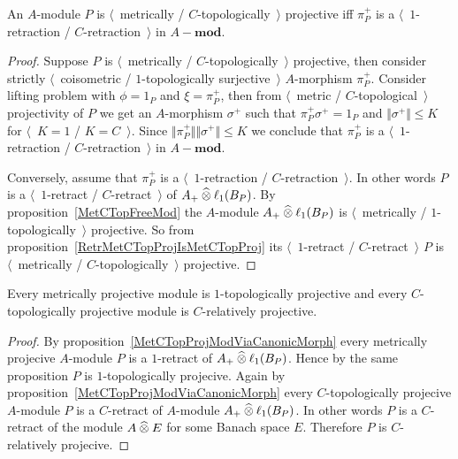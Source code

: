 \begin{proposition}\label{MetCTopProjModViaCanonicMorph} An $A$-module $P$ is
$\langle$~metrically / $C$-topologically~$\rangle$ projective iff $\pi_P^+$ is 
a $\langle$~$1$-retraction / $C$-retraction~$\rangle$ in $A-\mathbf{mod}$.
\end{proposition}
\begin{proof}
Suppose $P$ is 
$\langle$~metrically / $C$-topologically~$\rangle$ projective, then consider 
strictly $\langle$~coisometric / $1$-topologically surjective~$\rangle$
$A$-morphism $\pi_P^+$. Consider lifting problem with $\phi=1_P$ 
and $\xi=\pi_P^+$, then from $\langle$~metric / $C$-topological~$\rangle$ 
projectivity of $P$ we get an $A$-morphism $\sigma^+$ such 
that $\pi_P^+\sigma^+=1_P$
and $\Vert\sigma^+\Vert\leq K$ for $\langle$~$K=1$ / $K=C$~$\rangle$.
Since $\Vert\pi_P^+\Vert\Vert \sigma^+\Vert\leq K$ 
we conclude that $\pi_P^+$ is a
$\langle$~$1$-retraction / $C$-retraction~$\rangle$ in $A-\mathbf{mod}$.

Conversely, assume that $\pi_P^+$ is 
a $\langle$~$1$-retraction / $C$-retraction~$\rangle$. In other words $P$ is 
a $\langle$~$1$-retract / $C$-retract~$\rangle$ of $A_+\mathbin{\widehat{\otimes}} \ell_1(B_P)$. 
By proposition~\ref{MetCTopFreeMod} the $A$-module $A_+\mathbin{\widehat{\otimes}} \ell_1(B_P)$ 
is $\langle$~metrically / $1$-topologically~$\rangle$ projective. So from 
proposition~\ref{RetrMetCTopProjIsMetCTopProj} 
its $\langle$~$1$-retract / $C$-retract~$\rangle$ $P$ is 
$\langle$~metrically / $C$-topologically~$\rangle$ projective.
\end{proof}

\begin{proposition}\label{MetProjIsTopProjAndTopProjIsRelProj} Every metrically
projective module is $1$-topologically projective and every $C$-topologically 
projective module is $C$-relatively projective.
\end{proposition}
\begin{proof} By proposition~\ref{MetCTopProjModViaCanonicMorph} every 
metrically projecive $A$-module $P$ is a $1$-retract 
of $A_+\mathbin{\widehat{\otimes}} \ell_1(B_P)$. Hence by the same proposition $P$ 
is $1$-topologically projecive. Again by 
proposition~\ref{MetCTopProjModViaCanonicMorph} every $C$-topologically 
projecive $A$-module $P$ is a $C$-retract of $A$-module $A_+\mathbin{\widehat{\otimes}} \ell_1(B_P)$. 
In other words $P$ is a $C$-retract of the module $A\mathbin{\widehat{\otimes}} E$ for some Banach
space $E$. Therefore $P$ is $C$-relatively projecive.
\end{proof}



